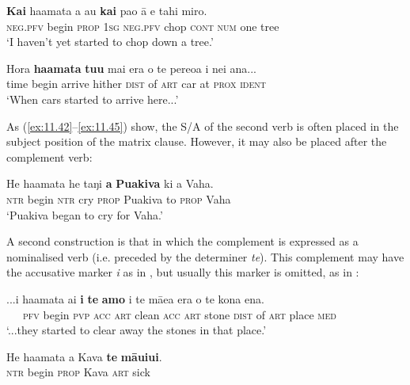 \ea\label{ex:11.45}
\gll \textbf{Kai} ha{\ꞌ}amata a au \textbf{kai} pa{\ꞌ}o {\ꞌ}ā e tahi miro. \\
\textsc{neg.pfv} begin \textsc{prop} \textsc{1sg} \textsc{neg.pfv} chop \textsc{cont} \textsc{num} one tree \\

\glt 
‘I haven’t yet started to chop down a tree.’ \textstyleExampleref{[R363.091]} 
\z

\ea\label{ex:11.46}
\gll Hora \textbf{ha{\ꞌ}amata} \textbf{tu{\ꞌ}u} mai era o te pere{\ꞌ}oa {\ꞌ}i nei {\ꞌ}ana... \\
time begin arrive hither \textsc{dist} of \textsc{art} car at \textsc{prox} \textsc{ident} \\

\glt
‘When cars started to arrive here...’ \textstyleExampleref{[R539-2.145]}
\z

As (\ref{ex:11.42}–\ref{ex:11.45}) show, the S/A of the second verb is often placed in the subject position of the matrix clause. However, it may also be placed after the complement verb:

\ea\label{ex:11.47}
\gll He ha{\ꞌ}amata he taŋi \textbf{a} \textbf{Puakiva} ki a Vaha. \\
\textsc{ntr} begin \textsc{ntr} cry \textsc{prop} Puakiva to \textsc{prop} Vaha \\

\glt 
‘Puakiva began to cry for Vaha.’ \textstyleExampleref{[R229.149]} 
\z

A second construction is that in which the complement is expressed as a nominalised verb (i.e. preceded by the determiner \textit{te}). This complement may have the accusative marker \textit{i} as in , but usually this marker is omitted, as in :

\ea\label{ex:11.48}
\gll ...i ha{\ꞌ}amata ai \textbf{i} \textbf{te} \textbf{amo} i te mā{\ꞌ}ea era o te kona ena. \\
~~~\textsc{pfv} begin \textsc{pvp} \textsc{acc} \textsc{art} clean \textsc{acc} \textsc{art} stone \textsc{dist} of \textsc{art} place \textsc{med} \\

\glt 
‘...they started to clear away the stones in that place.’ \textstyleExampleref{[R539-2.213]}
\z

\ea\label{ex:11.49}
\gll He ha{\ꞌ}amata a Kava \textbf{te} \textbf{māuiui}. \\
\textsc{ntr} begin \textsc{prop} Kava \textsc{art} sick \\

